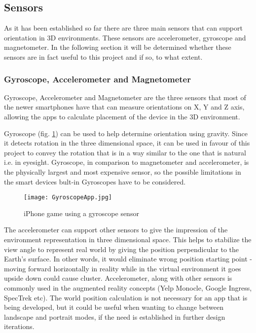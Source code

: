 \subsection{Sensors} \label{sensors}

As it has been established so far there are three main sensors that can support orientation in 3D environments. These sensors are accelerometer, gyroscope and magnetometer. In the following section it will be determined whether these sensors are in fact useful to this project and if so, to what extent.

\subsubsection*{Gyroscope, Accelerometer and Magnetometer}
Gyroscope, Accelerometer and Magnetometer are the three sensors that most of the newer smartphones have \cite{AndroidDevelopers} that can measure orientations on X, Y and Z axis, allowing the apps to calculate placement of the device in the 3D environment.

Gyroscope (fig. \ref{fig:GyroControl}) can be used to help determine orientation using gravity. Since it detects rotation in the three dimensional space, it can be used in favour of this project to convey the rotation that is in a way similar to the one that is natural i.e. in eyesight. Gyroscope, in comparison to magnetometer and accelerometer, is the physically largest and most expensive sensor, so the possible limitations in the smart devices bult-in Gyroscopes have to be considered.

\begin{figure}[H]
\centering
\texttt{[image: GyroscopeApp.jpg]}
\caption{iPhone game using a gyroscope sensor}
\label{fig:GyroControl}
\end{figure}

The accelerometer can support other sensors to give the impression of the environment representation in three dimensional space. This helps to stabilize the view angle to represent real world by giving the position perpendicular to the Earth's surface. In other words, it would eliminate wrong position starting point - moving forward horizontally in reality while in the virtual environment it goes upside down could cause cluster. Accelerometer, along with other sensors is commonly used in the augmented reality concepts (Yelp Monocle, Google Ingress, SpecTrek etc). The world position calculation is not necessary for an app that is being developed, but it could be useful when wanting to change between landscape and portrait modes, if the need is established in further design iterations.

